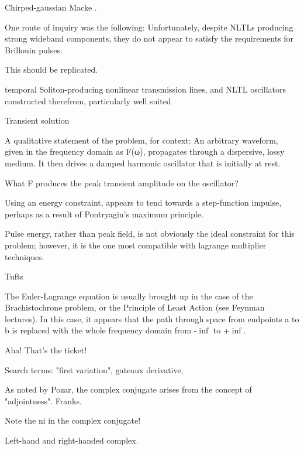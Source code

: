 \documentclass[paper.tex]{subfiles}
\begin{document}
Chirped-gaussian Macke \cite{Simple2012}.



One route of inquiry was the following: Unfortunately, despite NLTLs producing strong wideband components, they do not appear to satisfy the requirements for Brillouin pulses. 
\begin{autem}
	This should be replicated.
\end{autem}

temporal Soliton-producing nonlinear transmission lines, and NLTL oscillators constructed therefrom, particularly well suited 


Transient solution


A qualitative statement of the problem, for context:
An arbitrary waveform, given in the frequency domain as F(ω),
propagates through a dispersive, lossy medium. It then drives a
damped harmonic oscillator that is initially at rest.


What F produces the peak transient amplitude on the oscillator?



Using an energy constraint, appears to tend towards a step-function impulse, perhaps as a result of Pontryagin's maximum principle.


Pulse energy, rather than peak field, is not obviously the ideal constraint for this problem; however, it is the one most compatible with lagrange multiplier techniques.

Tufts \cite{Optimum1964}

The Euler-Lagrange equation is usually brought up in the case of the Brachistochrone problem, or the Principle of Least Action (see Feynman lectures). In this case, it appears that the path through space from endpoints a to b is replaced with the whole frequency domain from -$\inf$ to +$\inf$. 

Aha! That's the ticket! 

Search terms: "first variation", gateaux derivative, 

As noted by Pozar, the complex conjugate arises from the concept of "adjointness". Franks.

Note the ni in the complex conjugate!


Left-hand and right-handed complex.
\end{document}
